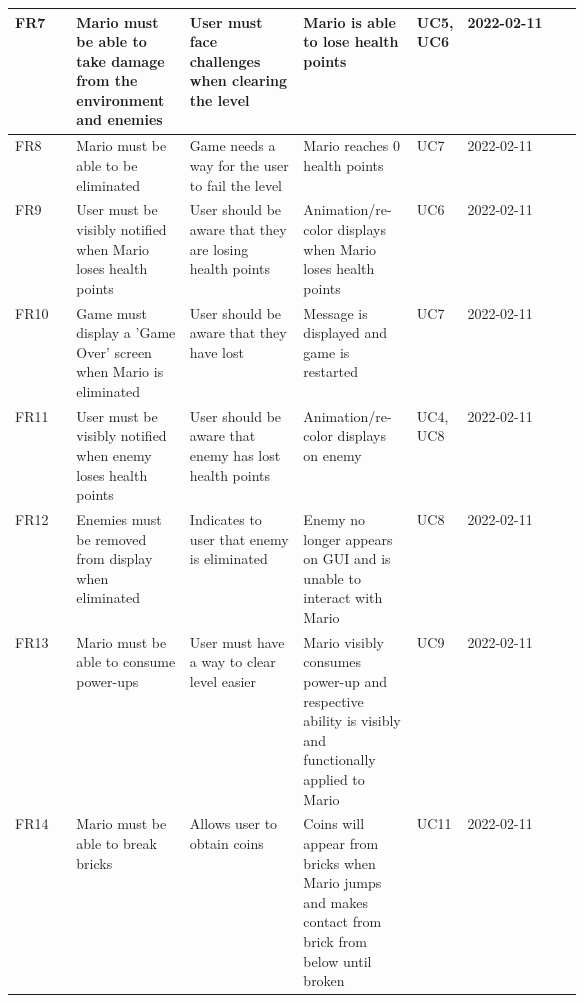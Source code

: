 \documentclass[12pt, titlepage]{article}
\begin{document}
\begin{longtable}{|l|p{0.2\linewidth}|p{0.2\linewidth}|p{0.2\linewidth}|p{0.06\linewidth}|l|}
FR7         & Mario must be able to take damage from the environment and enemies   & User must face challenges when clearing the level                                    & Mario is able to lose health points                                                                 & UC5, UC6          & 2022-02-11       \\ \hline
FR8         & Mario must be able to be eliminated                                  & Game needs a way for the user to fail the level                                      & Mario reaches 0 health points                                                                       & UC7               & 2022-02-11       \\ \hline
FR9         & User must be visibly notified when Mario loses health points         & User should be aware that they are losing health points                              & Animation/re-color displays when Mario loses health points                                          & UC6               & 2022-02-11       \\ \hline
FR10        & Game must display a 'Game Over' screen when Mario is eliminated      & User should be aware that they have lost                                             & Message is displayed and game is restarted                                                          & UC7               & 2022-02-11       \\ \hline
FR11        & User must be visibly notified when enemy loses health points         & User should be aware that enemy has lost health points                               & Animation/re-color displays on enemy                                                                & UC4, UC8          & 2022-02-11       \\ \hline
FR12        & Enemies must be removed from display when eliminated                 & Indicates to user that enemy is eliminated                                           & Enemy no longer appears on GUI and is unable to interact with Mario                                 & UC8               & 2022-02-11       \\ \hline
FR13        & Mario must be able to consume power-ups                              & User must have a way to clear level easier                                           & Mario visibly consumes power-up and respective ability is visibly and functionally applied to Mario & UC9               & 2022-02-11       \\ \hline
FR14        & Mario must be able to break bricks                                   & Allows user to obtain coins                                                          & Coins will appear from bricks when Mario jumps and makes contact from brick from below until broken & UC11              & 2022-02-11       \\ \hline

\end{longtable}
\end{document}
